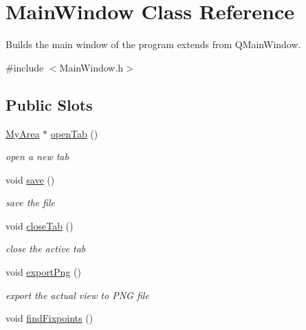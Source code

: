 \hypertarget{class_main_window}{\section{\-Main\-Window \-Class \-Reference}
\label{class_main_window}
}


\-Builds the main window of the program extends from \-Q\-Main\-Window.  




{\ttfamily \#include $<$\-Main\-Window.\-h$>$}

\subsection*{\-Public \-Slots}
\begin{DoxyCompactItemize}
\item 
\hyperlink{class_my_area}{\-My\-Area} $\ast$ \hyperlink{class_main_window_a3ecd23a0dc61406e34522af9aae150bb}{open\-Tab} ()
\begin{DoxyCompactList}\small\item\em open a new tab \end{DoxyCompactList}\item 
\hypertarget{class_main_window_a3ba1a371fb10e731ae0926ae85efeb4f}{void \hyperlink{class_main_window_a3ba1a371fb10e731ae0926ae85efeb4f}{save} ()}\label{class_main_window_a3ba1a371fb10e731ae0926ae85efeb4f}

\begin{DoxyCompactList}\small\item\em save the file \end{DoxyCompactList}\item 
\hypertarget{class_main_window_af622a541e4d87f86e9e83d29af60fe19}{void \hyperlink{class_main_window_af622a541e4d87f86e9e83d29af60fe19}{close\-Tab} ()}\label{class_main_window_af622a541e4d87f86e9e83d29af60fe19}

\begin{DoxyCompactList}\small\item\em close the active tab \end{DoxyCompactList}\item 
\hypertarget{class_main_window_a111875a1d82e77178636322ab485e4bb}{void \hyperlink{class_main_window_a111875a1d82e77178636322ab485e4bb}{export\-Png} ()}\label{class_main_window_a111875a1d82e77178636322ab485e4bb}

\begin{DoxyCompactList}\small\item\em export the actual view to \-P\-N\-G file \end{DoxyCompactList}\item 
\hypertarget{class_main_window_a879f655b0a921bc80bd316579e98c366}{void \hyperlink{class_main_window_a879f655b0a921bc80bd316579e98c366}{find\-Fixpoints} ()}\label{class_main_window_a879f655b0a921bc80bd316579e98c366}


\end{DoxyCompactItemize}
